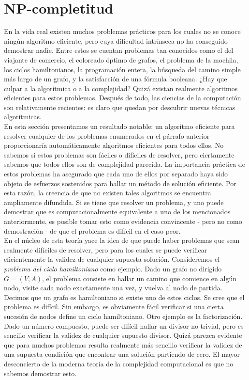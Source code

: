 \section{NP-completitud}\label{sec:NP-section}

En la vida real existen muchos problemas prácticos para los cuales no se conoce ningún algoritmo eficiente, pero cuya dificultad intrínseca no ha conseguido demostrar nadie. Entre estos se cuentan problemas tan conocidos como el del viajante de comercio, el coloreado óptimo de grafos, el problema de la mochila, los ciclos hamiltonianos, la programación entera, la búsqueda del camino simple más largo de un grafo, y la satisfacción de una fórmula booleana. ¿Hay que culpar a la algorítmica o a la complejidad? Quizá existan realmente algoritmos eficientes para estos problemas. Después de todo, las ciencias de la computación son relativamente recientes: es claro que quedan por descubrir nuevas técnicas algorítmicas.\\

En esta sección presentamos un resultado notable: un algoritmo eficiente para resolver cualquier de los problemas enumerados en el párrafo anterior proporcionaría automáticamente algoritmos eficientes para todos ellos. No sabemos si estos problemas son fáciles o difíciles de resolver, pero ciertamente sabemos que todos ellos son de complejidad parecida. La importancia práctica de estos problemas ha asegurado que cada uno de ellos por separado haya sido objeto de esfuerzos sostenidos para hallar un método de solución eficiente. Por esta razón, la creencia de que no existen tales algoritmos se encuentra ampliamente difundida. Si se tiene que resolver un problema, y uno puede demostrar que es computacionalmente equivalente a uno de los mencionados anteriormente, es posible tomar esto como evidencia convincente - pero no como demostración - de que el problema es difícil en el caso peor. \\

En el núcleo de esta teoría yace la idea de que puede haber problemas que sean realmente difíciles de resolver, pero para los cuales se puede verificar eficientemente la validez de cualquier supuesta solución. Consideremos el \emph{problema del ciclo hamiltoniano} como ejemplo. Dado un grafo no dirigido $G = (V,A)$, el problema consiste en hallar un camino que comience en algún nodo, visite cada nodo exactamente una vez, y vuelva al nodo de partida. Decimos que un grafo es hamiltoniano si existe uno de estos ciclos. Se cree que el problema es difícil. Sin embargo, es obviamente fácil verificar si una cierta sucesión de nodos define un ciclo hamiltoniano. Otro ejemplo es la factorización. Dado un número compuesto, puede ser difícil hallar un divisor no trivial, pero es sencillo verificar la validez de cualquier supuesto divisor. Quizá parezca evidente que para muchos problemas resulta realmente más sencillo verificar la validez de una supuesta condición que encontrar una solución partiendo de cero. El mayor desconcierto de la moderna teoría de la complejidad computacional es que no sabemos demostrar esto.\\

